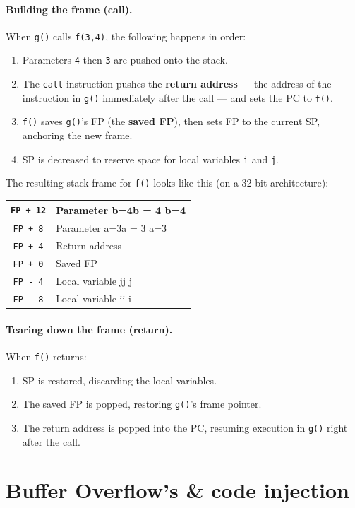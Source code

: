 \paragraph{Building the frame (call).}
When \texttt{g()} calls \texttt{f(3,4)}, the following happens in order:
\begin{enumerate}
\item Parameters \texttt{4} then \texttt{3} are pushed onto the stack.
\item The \texttt{call} instruction pushes the \textbf{return address} — the address of the instruction in \texttt{g()} immediately after the call — and sets the PC to \texttt{f()}.
\item \texttt{f()} saves \texttt{g()}'s FP (the \textbf{saved FP}), then sets FP to the current SP, anchoring the new frame.
\item SP is decreased to reserve space for local variables \texttt{i} and \texttt{j}.
\end{enumerate}
The resulting stack frame for \texttt{f()} looks like this (on a 32-bit architecture):
\begin{center}
\begin{tabular}{|c|l|}
\hline
\texttt{FP + 12} & Parameter b=4b = 4
b=4 \\
\hline
\texttt{FP + 8}  & Parameter a=3a = 3
a=3 \\
\hline
\texttt{FP + 4}  & Return address \\
\hline
\texttt{FP + 0}  & Saved FP \\
\hline
\texttt{FP - 4}  & Local variable jj
j \\
\hline
\texttt{FP - 8}  & Local variable ii
i \\
\hline
\end{tabular}
\end{center}
\paragraph{Tearing down the frame (return).}
When \texttt{f()} returns:
\begin{enumerate}
\item SP is restored, discarding the local variables.
\item The saved FP is popped, restoring \texttt{g()}'s frame pointer.
\item The return address is popped into the PC, resuming execution in \texttt{g()} right after the call.
\end{enumerate}

\section{Buffer Overflow's \& code injection}
